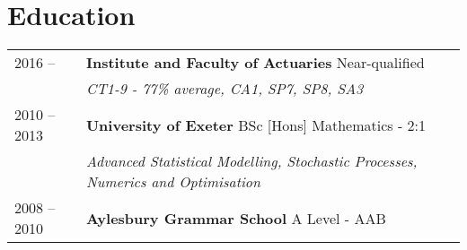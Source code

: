 \documentclass[11pt]{article}
\begin{document}
\section*{Education}
\begin{tabular}{l | l l}
2016 --  & \textbf{Institute and Faculty of Actuaries} Near-qualified \\
& \hspace{4mm} \textit{CT1-9 - 77\% average, CA1, SP7, SP8, SA3} \\
2010 -- 2013 & \textbf{University of Exeter} BSc [Hons] Mathematics - 2:1\\
& \hspace{4mm} \textit{Advanced Statistical Modelling, Stochastic Processes, Numerics and Optimisation }\\
2008 -- 2010 & \textbf{Aylesbury Grammar School} A Level - AAB \\
\end{tabular}
\end{document}
